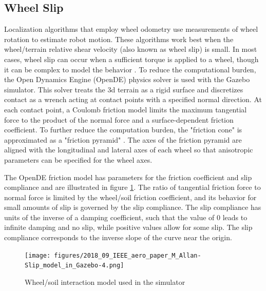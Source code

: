 \documentclass[twocolumn,letterpaper]{IEEEAerospaceCLS}  %
\begin{document}
\subsection{Wheel Slip}
Localization algorithms that employ wheel odometry use measurements of wheel rotation to estimate robot motion.
These algorithms work best when the wheel/terrain relative shear velocity (also known as wheel slip) is small.
In most cases, wheel slip can occur when a sufficient torque is applied to a wheel,
though it can be complex to model the behavior \cite{yoshida1013712}.
To reduce the computational burden, the Open Dynamics Engine (OpenDE) physics solver is used with the Gazebo simulator.
This solver treats the 3d terrain as a rigid surface and discretizes contact as a wrench
acting at contact points with a specified normal direction.
At each contact point, a Coulomb friction model limits the maximum tangential force
to the product of the normal force and a surface-dependent friction coefficient.
To further reduce the computation burden, the "friction cone" is approximated
as a "friction pyramid" \cite{hsuPeters2014}.
The axes of the friction pyramid are aligned with the longitudinal and lateral axes of each wheel
so that anisotropic parameters can be specified for the wheel axes.

The OpenDE friction model has parameters for the friction coefficient and slip compliance
and are illustrated in figure \ref{fig:wheelsoilmodel}.
The ratio of tangential friction force to normal force is limited by the wheel/soil friction coefficient,
and its behavior for small amounts of slip is governed by the slip compliance.
The slip compliance has units of the inverse of a damping coefficient,
such that the value of 0 leads to infinite damping and no slip,
while positive values allow for some slip.
The slip compliance corresponds to the inverse slope of the curve near the origin.

\begin{figure}[h!]
    \texttt{[image: figures/2018\_09\_IEEE\_aero\_paper\_M\_Allan-Slip\_model\_in\_Gazebo-4.png]}
    \caption{Wheel/soil interaction model used in the simulator}
    \label{fig:wheelsoilmodel}
\end{figure}
\end{document}
